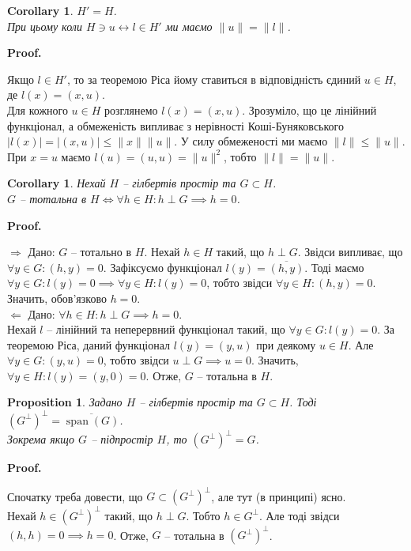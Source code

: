 \documentclass[a4paper, 10pt]{article}
\makeatletter
\def\rightproof{$\boxed{\Rightarrow}$ }
\def\leftproof{$\boxed{\Leftarrow}$ }
\theoremstyle{theoremdd}
\theoremstyle{theoremdd}
\theoremstyle{theoremdd}
\theoremstyle{theoremdd}
\theoremstyle{theoremdd}
\newtheorem{proposition}[theorem]{Proposition}
\theoremstyle{theoremdd}
\theoremstyle{theoremdd}
\theoremstyle{theoremdd}
\newtheorem{corollary}[theorem]{Corollary}
\renewenvironment{proof}[1][Proof.\\]{\par
\pushQED{\hfill \qed}%
\normalfont \topsep6\p@\@plus6\p@\relax
\trivlist
\item\relax
{\bfseries
#1\@addpunct{.}}\hspace\labelsep\ignorespaces
}{%
\popQED\endtrivlist\@endpefalse
}
\DeclareMathOperator{\linspan}{span}
\makeatother
\begin{document}
\begin{corollary}
$H' = H$.\\
При цьому коли $H \ni u \leftrightarrow l \in H'$ ми маємо $\|u\| = \|l\|$.
\end{corollary}

\begin{proof}
Якщо $l \in H'$, то за теоремою Ріса йому ставиться в відповідність єдиний $u \in H$, де $l(x) = (x,u)$.\\
Для кожного $u \in H$ розглянемо $l(x) = (x,u)$. Зрозуміло, що це лінійний функціонал, а обмеженість випливає з нерівності Коші-Буняковського $|l(x)| = |(x,u)| \leq \|x\| \|u\|$. У силу обмеженості ми маємо $\|l\| \leq \|u\|$. При $x = u$ маємо $l(u) = (u,u) = \|u\|^2$, тобто $\|l\| = \|u\|$.
\end{proof}

\begin{corollary}
Нехай $H$ -- гілбертів простір та $G \subset H$.\\
$G$ -- тотальна в $H \iff \forall h \in H: h \perp G \implies h = 0$.
\end{corollary}

\begin{proof}
\rightproof Дано: $G$ -- тотально в $H$. Нехай $h \in H$ такий, що $h \perp G$. Звідси випливає, що $\forall y \in G: (h,y) = 0$. Зафіксуємо функціонал $l(y) = \overline{(h,y)}$. Тоді маємо $\forall y \in G: l(y) = 0 \implies \forall y \in H: l(y) = 0$, тобто звідси $\forall y \in H: (h,y) = 0$. Значить, обов'язково $h = 0$.
\bigskip \\
\leftproof Дано: $\forall h \in H: h \perp G \implies h = 0$.\\
Нехай $l$ -- лінійний та неперервний функціонал такий, що $\forall y \in G: l(y) = 0$. За теоремою Ріса, даний функціонал $l(y) = (y,u)$ при деякому $u \in H$. Але $\forall y \in G: (y,u) = 0$, тобто звідси $u \perp G \implies u = 0$. Значить, $\forall y \in H: l(y) = (y,0) = 0$. Отже, $G$ -- тотальна в $H$.
\end{proof}

\begin{proposition}
Задано $H$ -- гілбертів простір та $G \subset H$. Тоді $(G^\perp)^\perp = \overline{\linspan(G)}$.\\
Зокрема якщо $G$ -- підпростір $H$, то $(G^\perp)^\perp = G$.
\end{proposition}

\begin{proof}
Спочатку треба довести, що $G \subset (G^\perp)^{\perp}$, але тут (в принципі) ясно.\\
Нехай $h \in (G^\perp)^\perp$ такий, що $h \perp G$. Тобто $h \in G^\perp$. Але тоді звідси $(h,h) = 0 \implies h = 0$. Отже, $G$ -- тотальна в $(G^\perp)^\perp$.
\end{proof}
\end{document}
